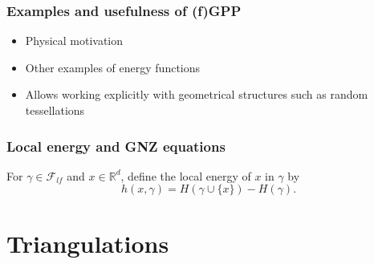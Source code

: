 \documentclass[c, 10pt]{beamer}
\begin{document}
\begin{frame}\frametitle{Examples and usefulness of (f)GPP}
\begin{itemize}
\item Physical motivation
\item Other examples of energy functions
\item Allows working explicitly with geometrical structures such as random tessellations
\end{itemize}
\end{frame}




\begin{frame}\frametitle{Local energy and GNZ equations}

For $\gamma \in \mathcal F_{lf}$ and $x \in \mathbb R^d$, define the \alert{local energy} of $x$ in $\gamma$ by
$$h(x,\gamma) = H(\gamma \cup \{x\}) - H(\gamma).$$




\end{frame}




\section{Triangulations}
\framesection{}
\end{document}
